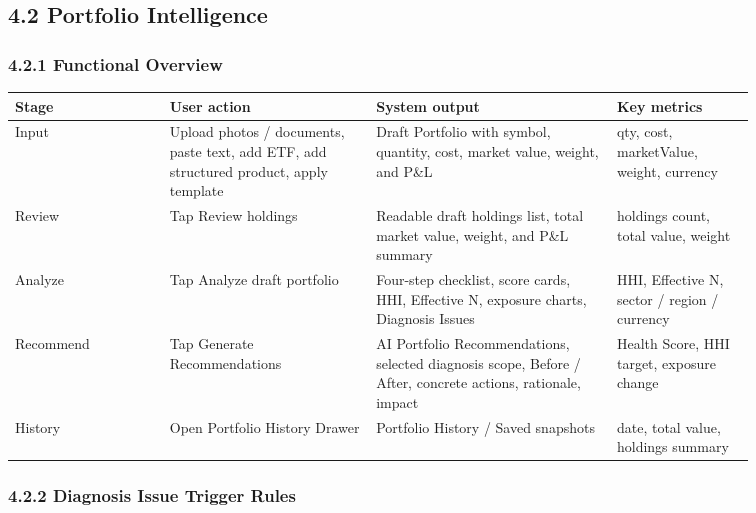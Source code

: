 \subsection{4.2 Portfolio Intelligence}

\subsubsection{4.2.1 Functional Overview}

\begingroup
\small
\begin{longtable}{L{0.18\linewidth}L{0.24\linewidth}L{0.28\linewidth}L{0.16\linewidth}}
\toprule
\textbf{Stage} & \textbf{User action} & \textbf{System output} & \textbf{Key metrics} \\
\midrule
Input & Upload photos / documents, paste text, add ETF, add structured product, apply template & Draft Portfolio with symbol, quantity, cost, market value, weight, and P\&L & qty, cost, marketValue, weight, currency \\
Review & Tap Review holdings & Readable draft holdings list, total market value, weight, and P\&L summary & holdings count, total value, weight \\
Analyze & Tap Analyze draft portfolio & Four-step checklist, score cards, HHI, Effective N, exposure charts, Diagnosis Issues & HHI, Effective N, sector / region / currency \\
Recommend & Tap Generate Recommendations & AI Portfolio Recommendations, selected diagnosis scope, Before / After, concrete actions, rationale, impact & Health Score, HHI target, exposure change \\
History & Open Portfolio History Drawer & Portfolio History / Saved snapshots & date, total value, holdings summary \\
\bottomrule
\end{longtable}
\endgroup

\subsubsection{4.2.2 Diagnosis Issue Trigger Rules}

